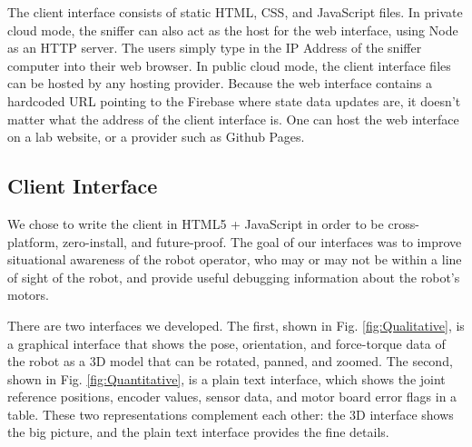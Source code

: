 \documentclass[letterpaper, 10 pt, conference]{ieee/ieeeconf}  %
\begin{document}
The client interface consists of static HTML, CSS, and JavaScript files.
In private cloud mode, the sniffer can also act as the host for the web interface, using Node as an HTTP server.
The users simply type in the IP Address of the sniffer computer into their web browser.
In public cloud mode, the client interface files can be hosted by any hosting provider.
Because the web interface contains a hardcoded URL pointing to the Firebase where state data updates are, it doesn't matter what the address of the client interface is.
One can host the web interface on a lab website, or a provider such as Github Pages.

\subsection{Client Interface}
We chose to write the client in HTML5 + JavaScript in order to be cross-platform, zero-install, and future-proof.
The goal of our interfaces was to improve situational awareness of the robot operator, who may or may not be within a line of sight of the robot, and provide useful debugging information about the robot's motors.

There are two interfaces we developed.
The first, shown in Fig. \ref{fig:Qualitative}, is a graphical interface that shows the pose, orientation, and force-torque data of the robot as a 3D model that can be rotated, panned, and zoomed.
The second, shown in Fig. \ref{fig:Quantitative}, is a plain text interface, which shows the joint reference positions, encoder values, sensor data, and motor board error flags in a table.
These two representations complement each other: the 3D interface shows the big picture, and the plain text interface provides the fine details.
\end{document}
